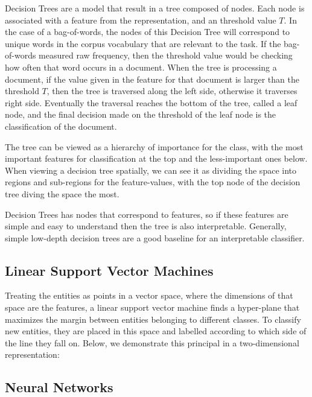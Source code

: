 Decision Trees are a model that result in a tree composed of nodes. Each node is associated with a feature from the representation, and  an  threshold value $T$. In the case of a bag-of-words, the nodes of this Decision Tree will correspond to unique words in the corpus vocabulary that are relevant to the task. If the bag-of-words measured raw frequency, then the threshold value would be checking how often that word occurs in  a document.  When the tree is processing a document, if the value given in the feature for that document is larger than the threshold $T$, then the tree is traversed along the left side, otherwise it traverses right side. Eventually the traversal reaches the bottom of the tree, called a leaf node, and the final  decision made on the threshold of the leaf node is the classification of the document. 

The tree can be viewed as a hierarchy of importance for the class, with the most important features for classification at the top and the less-important ones below. When viewing a decision tree spatially, we can see it as dividing the space into regions and sub-regions for the feature-values, with the top node of the decision tree diving the space the most.

Decision Trees has nodes that correspond to features, so if these features are simple and easy to understand then the tree is also interpretable. Generally, simple low-depth decision trees are a good baseline for an interpretable classifier. 


\subsection{Linear Support Vector Machines}\label{bg:svm}

Treating the entities as points in a vector space, where the dimensions of that space are the features,  a linear support vector machine  finds a hyper-plane that maximizes the margin between entities belonging to different classes. To classify new entities, they are placed in this space and labelled according to which side of the line they fall on. Below, we demonstrate this principal in a two-dimensional representation:




\subsection{Neural Networks}\label{bg:nn}

